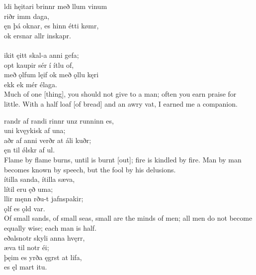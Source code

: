 \bva {}ldi hęitari \hld brinnr með llum vinum \\%
\ind {}riðr imm daga, \\%
ęn þá oknar, \hld es hinn étti kømr, \\%
\ind ok ersnar allr inskapr.\\%

 \\

\bva {}ikit ęitt \hld skal-a anni gefa; \\%
\ind opt kaupir sér í ítlu of, \\%
með ǫlfum lęif \hld ok með ǫllu kęri \\%
\ind {}ekk ek mér élaga.\\%

\bvb Much of one [thing], you should not give to a man; often you earn praise for little. With a half loaf [of bread] and an awry vat, I earned me a companion. \\

\bva {}randr af randi \hld {}rinnr unz runninn es, \\%
\ind {}uni kvęykisk af una; \\%
aðr af anni \hld verðr at áli kuðr; \\%
\ind ęn til ǿlskr af ul.\\%

\bvb Flame by flame burns, until is burnt [out]; fire is kindled by fire. Man by man becomes known by speech, but the fool by his delusions. \\

\bva {}ítilla sanda, \hld {}ítilla sæva, \\%
\ind lítil eru ęð uma; \\%
llir męnn \hld {}rðu-t jafnspakir; \\%
\ind {}ǫlf es ǫld var.\\%

\bvb Of small sands, of small seas, small are the minds of men; all men do not become equally wise; each man is half. \\

\bva {}eðalsnotr \hld skyli anna hvęrr, \\%
\ind æva til notr éi; \\%
þęim es yrða \hld {}ęgrst at lifa, \\%
\ind es ęl mart itu.\\%

